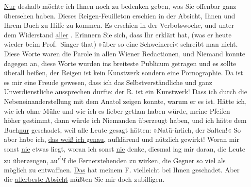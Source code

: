 \pstart
           \uline{Nur} deshalb möchte ich Ihnen noch zu bedenken geben,
               was Sie offenbar ganz übersehen haben. Dieses Reigen-Feuilleton erschien in der Absicht, Ihnen und Ihrem
                  Buch zu Hilfe zu kommen. Es
               erschien in der Verbotswoche, und unter dem Widerstand \uline{aller}{ }\label{K_L03353-6v}\label{K_L03353-6}. Erinnern Sie sich, dass Ihr \label{K_L03353-7v}\label{K_L03353-7} erklärt hat, (was er heute wieder beim
                  Prof. Singer that) »über so eine
               Schweinerei« schreibt man nicht. Diese Worte waren die Parole in allen Wiener Redactionen\textcolor{gray}{,} und Niemand
               konnte dagegen an, diese Worte wurden ins breiteste Publicum getragen und es sollte
               überall heißen, der Reigen ist kein Kunstwerk
               sondern eine Pornographie. Da ist es mir eine Freude gewesen, dass ich das
               Selbstverständliche und ganz Unverdienstliche aussprechen durfte: der R. ist ein Kunstwerk! Dass ich durch die
               Nebeneinanderstellung mit dem Anatol zeigen
               konnte, warum er es ist. Hätte ich, wie ich ohne Mühe und wie ich es lieber gethan
               haben würde, meine Pfeifen höher gestimmt, dann würde ich Niemanden überzeugt haben,
               und ich hätte dem Buch\uline{nur} geschadet, weil alle Leute gesagt hätten:
               »Natü-ürlich, der Salten!« So aber habe ich, \uline{das weiß ich
                  genau}, aufklärend und nützlich gewirkt! Woran mir sonst \uline{nie} etwas liegt, woran ich sonst \uline{nie}
               denke, diesmal lag mir daran, die Leute zu überzeugen, au\substVorne{}\textsuperscript{ch}\substDazwischen{}f\substHinten{} die Fernerstehenden zu wirken, die Gegner so viel als möglich zu entwaffnen.
                  \uline{Das} hat meinem F. vielleicht bei Ihnen geschadet. Aber die \uline{allerbeste Absicht} müßten Sie mir doch zubilligen.\pend
           
